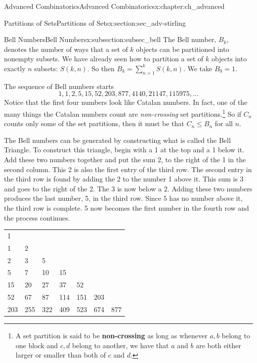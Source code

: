 \documentclass[oneside,10pt,]{book}
\newcommand{\terminology}[1]{\textbf{#1}}
\numberwithin{equation}{chapter}
\begin{document}
\begin{chapterptx}{Advanced Combinatorics}{}{Advanced Combinatorics}{}{}{x:chapter:ch_advanced}
\begin{sectionptx}{Partitions of Sets}{}{Partitions of Sets}{}{}{x:section:sec_adv-stirling}
\typeout{************************************************}
%
\begin{subsectionptx}{Bell Numbers}{}{Bell Numbers}{}{}{x:subsection:subsec_bell}
The Bell number, \(B_{k}\), denotes the number of ways that a set of \(k\) objects can be partitioned into nonempty subsets. We have already seen how to partition a set of \(k\) objects into exactly \(n\) subsets: \(S(k,n)\).  So then \(B_k = \sum_{n=1}^kS(k,n)\).  We take \(B_0 = 1\).%
\par
The sequence of Bell numbers starts%
\begin{equation*}
1, 1, 2, 5, 15, 52, 203, 877, 4140, 21147, 115975, \ldots
\end{equation*}
Notice that the first four numbers look like Catalan numbers.  In fact, one of the many things the Catalan numbers count are \emph{non-crossing} set partitions.\footnote{A set partition is said to be \terminology{non-crossing} as long as whenever \(a,b\) belong to one block and \(c,d\) belong to another, we have that \(a\) and \(b\) are both either larger or smaller than both of \(c\) and \(d\).\label{g:fn:idm7030}}  So if \(C_n\) counts only some of the set partitions, then it must be that \(C_n \le B_n\) for all \(n\).%
\par
The Bell numbers can be generated by constructing what is called the Bell Triangle. To construct this triangle, begin with a 1 at the top and a 1 below it. Add these two numbers together and put the sum 2, to the right of the 1 in the second column. This 2 is also the first entry of the third row. The second entry in the third row is found by adding the 2 to the number 1 above it. This sum is 3 and goes to the right of the 2. The 3 is now below a 2. Adding these two numbers produces the last number, 5, in the third row. Since 5 has no number above it, the third row is complete. 5 now becomes the first number in the fourth row and the process continues.%
\begin{sidebyside}{1}{0.15}{0.15}{0}%
\begin{sbspanel}{0.7}%
{\centering%
\begin{tabular}{lllllll}
1&&&&&&\tabularnewline[0pt]
1&2&&&&&\tabularnewline[0pt]
2&3&5&&&&\tabularnewline[0pt]
5&7&10&15&&&\tabularnewline[0pt]
15&20&27&37&52&&\tabularnewline[0pt]
52&67&87&114&151&203&\tabularnewline[0pt]
203&255&322&409&523&674&877
\end{tabular}
\par}
\end{sbspanel}%

\end{sidebyside}
\end{subsectionptx}
\end{sectionptx}
\end{chapterptx}
\end{document}

